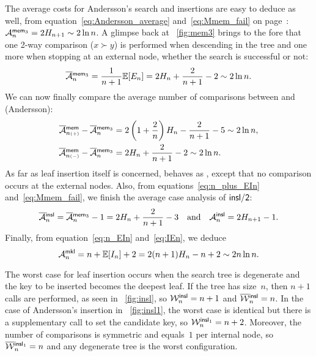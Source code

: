 The average costs for Andersson's search and insertions are easy to
deduce as well, from equation~\eqref{eq:Andersson_average}
 and~\eqref{eq:Mmem_fail} on
page~\pageref{eq:Mmem_fail}: \(\M{\fun{mem}_3}{n} = 2H_{n+1} \sim 2
\ln n\). A glimpse back at
\fig~\vref{fig:mem3} brings to the fore that one 2-way comparison (\(x
\succ y\)) is performed when descending in the tree and one more when
stopping at an external node, whether the search is successful or not:
\begin{equation*}
  \OM{\fun{mem}_3}{n} = \frac{1}{n+1}\Expected{E_n} =
  2H_n + \frac{2}{n+1} - 2 \sim 2\ln n.
\end{equation*}
We can now finally compare the average number of comparisons between
 and  (Andersson):
\begin{align*}
  \OM{\fun{mem}}{n{\scriptscriptstyle(+)}} - \OM{\fun{mem}_3}{n}
&= 2\left(1 + \frac{2}{n}\right)H_n - \frac{2}{n+1} - 5 \sim 2\ln n,\\
  \OM{\fun{mem}}{n{\scriptscriptstyle(-)}} - \OM{\fun{mem}_3}{n}
&= 2H_n + \frac{2}{n+1} - 2 \sim 2\ln n.
\end{align*}
As far as leaf insertion itself is concerned,
 behaves as
, except that no
comparison occurs at the external nodes. Also, from
equations~\eqref{eq:n_plus_EIn} and~\eqref{eq:Mmem_fail}, we finish
the average case analysis of \(\fun{insl/2}\):
\begin{equation*}
  \OM{\fun{insl}}{n} =
  \OM{\fun{mem}_3}{n} - 1 = 2H_n + \frac{2}{n+1} -
  3\quad\text{and}\quad \M{\fun{insl}}{n} = 2H_{n+1} - 1.
\index{insl@$\OM{\fun{insl}}{n}$}
\index{mem3@$\OM{\fun{mem}_3}{n}$}
\end{equation*}
Finally, from equation~\eqref{eq:n_EIn} and~\eqref{eq:IEn}, we deduce
\begin{equation}
\M{\fun{mkl}}{n} = n + \Expected{I_n} + 2 = 2(n+1)H_n - n + 2
\sim 2n\ln n.
\index{mkl@$\M{\fun{mkl}}{n}$}
\label{eq:Mmkl}
\end{equation}


The worst case for leaf insertion occurs when the search tree is
degenerate and the key to be
inserted becomes the deepest leaf. If the tree has size~\(n\), then
\(n+1\) calls are performed, as seen in \fig~\vref{fig:insl}, so
\(\W{\fun{insl}}{n} = n + 1\) and
\(\OW{\fun{insl}}{n} = n\). In the
case of Andersson's insertion in \fig~\vref{fig:insl1}, the worst case
is identical but there is a supplementary call to set the candidate
key, so \(\W{\fun{insl}_1}{n} = n +
2\). Moreover, the number of
comparisons is symmetric and equals~\(1\) per internal node, so
\(\OW{\fun{insl}_1}{n} = n\) and
any degenerate tree is the worst configuration.

